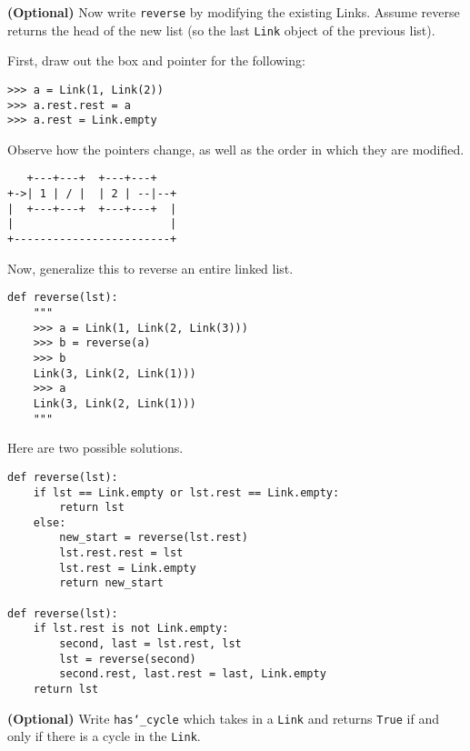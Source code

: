 \documentclass{exam}
\begin{document}
\begin{questions}
\begin{blocksection}
\end{blocksection}

\begin{blocksection}
\question \textbf{(Optional)} Now write \texttt{reverse} by modifying the existing Links. Assume reverse returns the head of the new list (so the last \texttt{Link} object of the previous list).

First, draw out the box and pointer for the following:
\begin{lstlisting}
>>> a = Link(1, Link(2))
>>> a.rest.rest = a
>>> a.rest = Link.empty
\end{lstlisting}
Observe how the pointers change, as well as the order in which they are
modified.
\begin{solution}[0.6in]
\begin{lstlisting}
   +---+---+  +---+---+
+->| 1 | / |  | 2 | --|--+
|  +---+---+  +---+---+  |
|                        |
+------------------------+
\end{lstlisting}
\end{solution}
\end{blocksection}

\begin{blocksection}
Now, generalize this to reverse an entire linked list.
\begin{lstlisting}
def reverse(lst):
    """
    >>> a = Link(1, Link(2, Link(3)))
    >>> b = reverse(a)
    >>> b
    Link(3, Link(2, Link(1)))
    >>> a
    Link(3, Link(2, Link(1)))
    """
\end{lstlisting}
\begin{solution}[1.00in]
Here are two possible solutions.
\begin{lstlisting}
def reverse(lst):
    if lst == Link.empty or lst.rest == Link.empty:
        return lst
    else:
        new_start = reverse(lst.rest)
        lst.rest.rest = lst
        lst.rest = Link.empty
        return new_start

def reverse(lst):
    if lst.rest is not Link.empty:
        second, last = lst.rest, lst
        lst = reverse(second)
        second.rest, last.rest = last, Link.empty
    return lst
\end{lstlisting}
\end{solution}


\end{blocksection}

\begin{blocksection}
\question \textbf{(Optional)} Write \texttt{has\char`_cycle} which takes in a
\texttt{Link} and returns \texttt{True} if and only if there is a cycle in the
\texttt{Link}.


\end{blocksection}
\end{questions}
\end{document}
